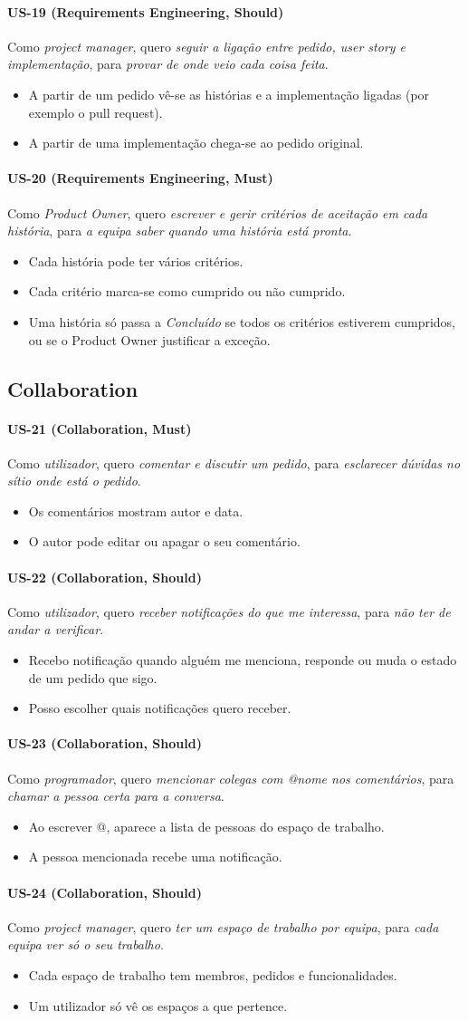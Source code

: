 \documentclass[12pt,a4paper]{article}
\newcommand{\us}[7]{%
  \paragraph{#1 \textnormal{(#2, #6)}}
  Como \textit{#3}, quero \textit{#4}, para \textit{#5}.
  \begin{itemize}
  #7
  \end{itemize}
}
\begin{document}
\us{US-19}{Requirements Engineering}{project manager}{seguir a ligação entre pedido, user story e implementação}{provar de onde veio cada coisa feita}{Should}{
\item A partir de um pedido vê-se as histórias e a implementação ligadas (por exemplo o pull request).
\item A partir de uma implementação chega-se ao pedido original.}

\us{US-20}{Requirements Engineering}{Product Owner}{escrever e gerir critérios de aceitação em cada história}{a equipa saber quando uma história está pronta}{Must}{
\item Cada história pode ter vários critérios.
\item Cada critério marca-se como cumprido ou não cumprido.
\item Uma história só passa a \textit{Concluído} se todos os critérios estiverem cumpridos, ou se o Product Owner justificar a exceção.}

\subsection{Collaboration}

\us{US-21}{Collaboration}{utilizador}{comentar e discutir um pedido}{esclarecer dúvidas no sítio onde está o pedido}{Must}{
\item Os comentários mostram autor e data.
\item O autor pode editar ou apagar o seu comentário.}

\us{US-22}{Collaboration}{utilizador}{receber notificações do que me interessa}{não ter de andar a verificar}{Should}{
\item Recebo notificação quando alguém me menciona, responde ou muda o estado de um pedido que sigo.
\item Posso escolher quais notificações quero receber.}

\us{US-23}{Collaboration}{programador}{mencionar colegas com @nome nos comentários}{chamar a pessoa certa para a conversa}{Should}{
\item Ao escrever @, aparece a lista de pessoas do espaço de trabalho.
\item A pessoa mencionada recebe uma notificação.}

\us{US-24}{Collaboration}{project manager}{ter um espaço de trabalho por equipa}{cada equipa ver só o seu trabalho}{Should}{
\item Cada espaço de trabalho tem membros, pedidos e funcionalidades.
\item Um utilizador só vê os espaços a que pertence.}
\end{document}
